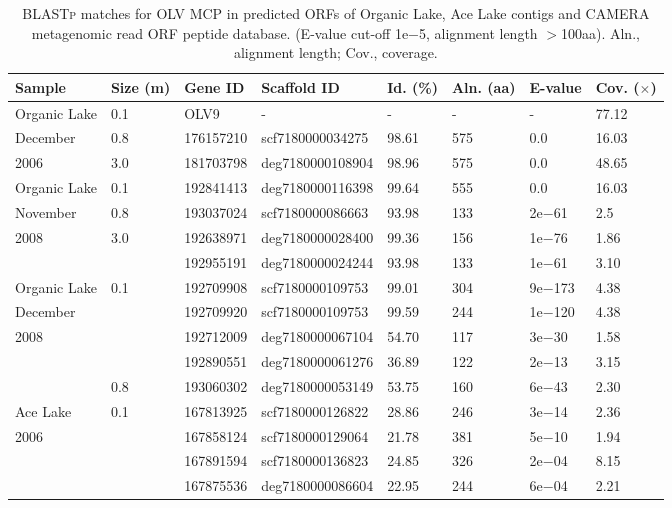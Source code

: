 \begingroup
\begin{table}
\footnotesize
\caption[\acs{OLV} \acs{MCP} in Organic Lake, Ace Lake and \acs{CAMERA}]{ \textsc{BLASTp} matches for \acs{OLV} \acs{MCP} in predicted \acs{ORF}s of Organic Lake, Ace Lake contigs and \acs{CAMERA} metagenomic read \acs{ORF} peptide database. (E-value cut-off 1e$-$5, alignment length $>$100aa). Aln., alignment length; Cov., coverage.}
\label{tab:olv_mcp_blastp}
\smallskip
\begin{tabularx}{\textwidth}{p{2.5cm}p{0.5cm}p{3.5cm}Xp{0.5cm}p{0.5cm}p{0.8cm}p{0.5cm}}
\toprule
\textbf{Sample} & \textbf{Size (\textmu{}m)} & \textbf{Gene ID} & \textbf{Scaffold ID} & \textbf{Id. (\%)} & \textbf{Aln. (aa)} & \textbf{E-value} & \textbf{Cov. ($\times$)} \\
\midrule
Organic Lake & 0.1 & OLV9 & - & - & - & - & 77.12 \\
December & 0.8 & 176157210 & scf7180000034275 & 98.61 & 575 & 0.0 & 16.03 \\
2006 & 3.0 & 181703798 & deg7180000108904 & 98.96 & 575 & 0.0 & 48.65 \\

Organic Lake & 0.1 & 192841413 & deg7180000116398 & 99.64 & 555 & 0.0 & 16.03 \\
November & 0.8 & 193037024 & scf7180000086663 & 93.98 & 133 & 2e$-$61 & 2.5 \\
2008 & 3.0 & 192638971 & deg7180000028400 & 99.36 & 156 & 1e$-$76 & 1.86 \\
 &  & 192955191 & deg7180000024244 & 93.98 & 133 & 1e$-$61 & 3.10 \\

Organic Lake & 0.1 & 192709908 & scf7180000109753 & 99.01 & 304 & 9e$-$173 & 4.38 \\
December &  & 192709920 & scf7180000109753 & 99.59 & 244 & 1e$-$120 & 4.38 \\
2008 &  & 192712009 & deg7180000067104 & 54.70 & 117 & 3e$-$30 & 1.58 \\
 &  & 192890551 & deg7180000061276 & 36.89 & 122 & 2e$-$13 & 3.15 \\
 & 0.8 & 193060302 & deg7180000053149 & 53.75 & 160 & 6e$-$43 & 2.30 \\

Ace Lake & 0.1 & 167813925 & scf7180000126822 & 28.86 & 246 & 3e$-$14 & 2.36  \\
2006 &  & 167858124 & scf7180000129064 & 21.78 & 381 & 5e$-$10 & 1.94 \\
 &  & 167891594 & scf7180000136823 & 24.85 & 326 & 2e$-$04 & 8.15 \\
 &  & 167875536 & deg7180000086604 & 22.95 & 244 & 6e$-$04 & 2.21 \\


\end{tabularx}
\end{table}
